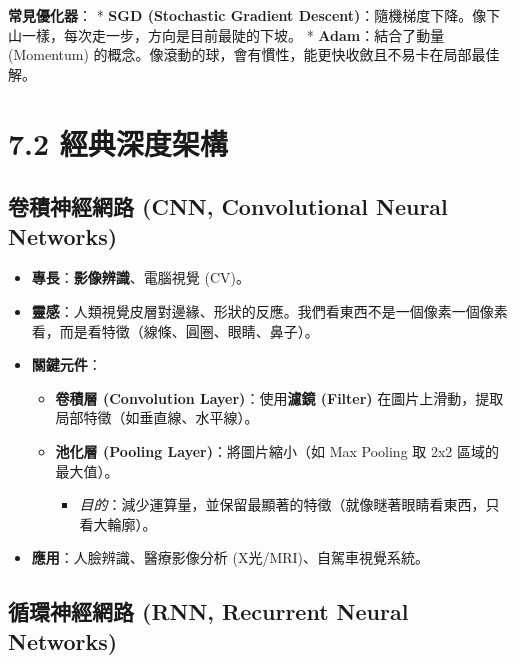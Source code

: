 \documentclass[
  letterpaper,
  DIV=11,
  numbers=noendperiod]{scrreprt}
\providecommand{\tightlist}{%
  \setlength{\itemsep}{0pt}\setlength{\parskip}{0pt}}
\begin{document}
\textbf{常見優化器}： * \textbf{SGD (Stochastic Gradient
Descent)}：隨機梯度下降。像下山一樣，每次走一步，方向是目前最陡的下坡。
* \textbf{Adam}：結合了動量 (Momentum)
的概念。像滾動的球，會有慣性，能更快收斂且不易卡在局部最佳解。

\chapter{7.2 經典深度架構}\label{sec-deep-architectures}

\section{卷積神經網路 (CNN, Convolutional Neural
Networks)}\label{sec-cnn}

\begin{itemize}
\tightlist
\item
  \textbf{專長}：\textbf{影像辨識}、電腦視覺 (CV)。
\item
  \textbf{靈感}：人類視覺皮層對邊緣、形狀的反應。我們看東西不是一個像素一個像素看，而是看特徵（線條、圓圈、眼睛、鼻子）。
\item
  \textbf{關鍵元件}：

  \begin{itemize}
  \tightlist
  \item
    \textbf{卷積層 (Convolution Layer)}：使用\textbf{濾鏡 (Filter)}
    在圖片上滑動，提取局部特徵（如垂直線、水平線）。
  \item
    \textbf{池化層 (Pooling Layer)}：將圖片縮小（如 Max Pooling 取 2x2
    區域的最大值）。

    \begin{itemize}
    \tightlist
    \item
      \emph{目的}：減少運算量，並保留最顯著的特徵（就像瞇著眼睛看東西，只看大輪廓）。
    \end{itemize}
  \end{itemize}
\item
  \textbf{應用}：人臉辨識、醫療影像分析 (X光/MRI)、自駕車視覺系統。
\end{itemize}

\section{循環神經網路 (RNN, Recurrent Neural Networks)}\label{sec-rnn}
\end{document}
